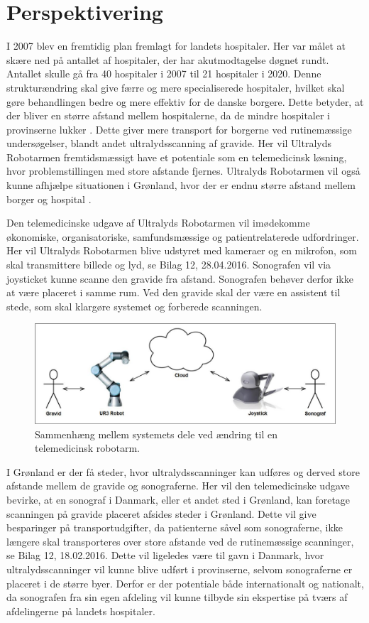\chapter{Perspektivering}
I 2007 blev en fremtidig plan fremlagt for landets hospitaler. Her var målet at skære ned på antallet af hospitaler, der har akutmodtagelse døgnet rundt. Antallet skulle gå fra 40 hospitaler i 2007 til 21 hospitaler i 2020. Denne strukturændring skal give færre og mere specialiserede hospitaler, hvilket skal gøre behandlingen bedre og mere effektiv for de danske borgere. Dette betyder, at der bliver en større afstand mellem hospitalerne, da de mindre hospitaler i provinserne lukker \cite{supersygehus}. Dette giver mere transport for borgerne ved rutinemæssige undersøgelser, blandt andet ultralydsscanning af gravide. Her vil Ultralyds Robotarmen fremtidsmæssigt have et potentiale som en telemedicinsk løsning, hvor problemstillingen med store afstande fjernes. Ultralyds Robotarmen vil også kunne afhjælpe situationen i Grønland, hvor der er endnu større afstand mellem borger og hospital \cite{greenland}.

Den telemedicinske udgave af Ultralyds Robotarmen vil imødekomme økonomiske, organisatoriske, samfundsmæssige og patientrelaterede udfordringer. Her vil Ultralyds Robotarmen blive udstyret med kameraer og en mikrofon, som skal transmittere billede og lyd, se Bilag 12, 28.04.2016. Sonografen vil via joysticket kunne scanne den gravide fra afstand. Sonografen behøver derfor ikke at være placeret i samme rum. Ved den gravide skal der være en assistent til stede, som skal klargøre systemet og forberede scanningen.

\begin{figure}[H]\centering
	\includegraphics[width = 1.0\textwidth]{Figurer/teknologiTelemedicin.jpg}
	\caption{Sammenhæng mellem systemets dele ved ændring til en telemedicinsk robotarm.}
	\label{systemTelemedicin}
\end{figure}

I Grønland er der få steder, hvor ultralydsscanninger kan udføres og derved store afstande mellem de gravide og sonograferne. Her vil den telemedicinske udgave bevirke, at en sonograf i Danmark, eller et andet sted i Grønland, kan foretage scanningen på gravide placeret afsides steder i Grønland. Dette vil give besparinger på transportudgifter, da patienterne såvel som sonograferne, ikke længere skal transporteres over store afstande ved de rutinemæssige scanninger, se Bilag 12, 18.02.2016. 
Dette vil ligeledes være til gavn i Danmark, hvor ultralydsscanninger vil kunne blive udført i provinserne, selvom sonograferne er placeret i de større byer. Derfor er der potentiale både internationalt og nationalt, da sonografen fra sin egen afdeling vil kunne tilbyde sin ekspertise på tværs af afdelingerne på landets hospitaler. 

